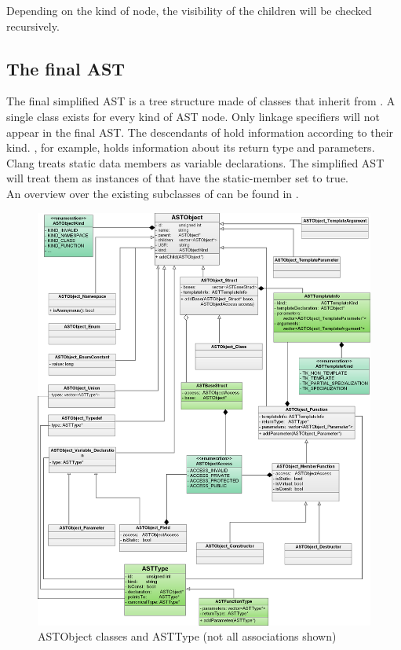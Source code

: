 Depending on the kind of node, the visibility of the children will be checked recursively.


\subsection{The final AST}

The final simplified AST is a tree structure made of classes that inherit from
. A single class exists for every kind of AST node. Only linkage specifiers will not appear in the final AST. The descendants of  hold information according to their kind. , for example, holds information about its return type and parameters. Clang treats static data members as variable declarations. The simplified AST will treat them as instances of  that have the static-member set to true.\\
An overview over the existing subclasses of  can be found in .

\begin{figure}[p] %
	\centering
		\includegraphics[scale=0.2]{Images/ASTObjectUML.png}
	\caption{ASTObject classes and ASTType (not all associations shown)}
	\label{fig:ASTObjectUML}
\end{figure}

